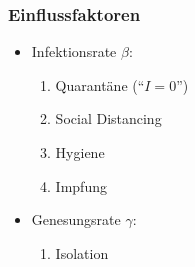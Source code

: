 %
%
%
\begin{frame}
\frametitle{Einflussfaktoren}

\begin{itemize}
\item Infektionsrate $\beta$:
\begin{enumerate}
\item<2-> Quarantäne (``$I=0$'')
\item<3-> Social Distancing 
\item<5-> Hygiene
\item<6-> Impfung
\end{enumerate}
\item Genesungsrate $\gamma$:
\begin{enumerate}
\item<8-> Isolation
\end{enumerate}
\end{itemize}
\end{frame}
